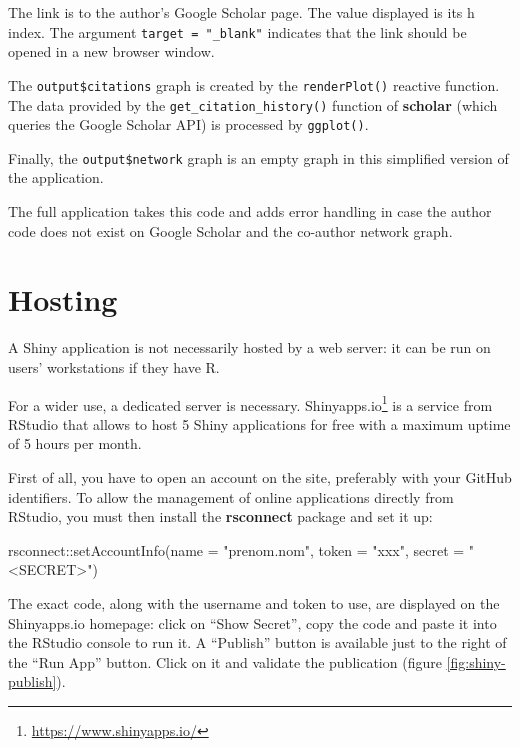 \documentclass[
  12pt,
  american,
  a4paper,
  extrafontsizes,onecolumn,openright
  ]{memoir}
\newenvironment{Shaded}{\begin{snugshade}}{\end{snugshade}}
\newcommand{\AttributeTok}[1]{\textcolor[rgb]{0.77,0.63,0.00}{#1}}
\newcommand{\FunctionTok}[1]{\textcolor[rgb]{0.00,0.00,0.00}{#1}}
\newcommand{\NormalTok}[1]{#1}
\newcommand{\SpecialCharTok}[1]{\textcolor[rgb]{0.00,0.00,0.00}{#1}}
\newcommand{\StringTok}[1]{\textcolor[rgb]{0.31,0.60,0.02}{#1}}
\begin{document}
\normalsize

The link is to the author's Google Scholar page.
The value displayed is its h index.
The argument \texttt{target\ =\ "\_blank"} indicates that the link should be opened in a new browser window.

The \texttt{output\$citations} graph is created by the \texttt{renderPlot()} reactive function.
The data provided by the \texttt{get\_citation\_history()} function of \textbf{scholar} (which queries the Google Scholar API) is processed by \texttt{ggplot()}.

Finally, the \texttt{output\$network} graph is an empty graph in this simplified version of the application.

The full application takes this code and adds error handling in case the author code does not exist on Google Scholar and the co-author network graph.

\hypertarget{sec:hebergement-shiny}{%
\section{Hosting}\label{sec:hebergement-shiny}}

A Shiny application is not necessarily hosted by a web server: it can be run on users' workstations if they have R.

For a wider use, a dedicated server is necessary.
Shinyapps.io\footnote{\url{https://www.shinyapps.io/}} is a service from RStudio that allows to host 5 Shiny applications for free with a maximum uptime of 5 hours per month.

First of all, you have to open an account on the site, preferably with your GitHub identifiers.
To allow the management of online applications directly from RStudio, you must then install the \textbf{rsconnect} package and set it up:

\scriptsize

\begin{Shaded}
\begin{Highlighting}[]
\NormalTok{rsconnect}\SpecialCharTok{::}\FunctionTok{setAccountInfo}\NormalTok{(}\AttributeTok{name =} \StringTok{"prenom.nom"}\NormalTok{, }\AttributeTok{token =} \StringTok{"xxx"}\NormalTok{,}
    \AttributeTok{secret =} \StringTok{"\textless{}SECRET\textgreater{}"}\NormalTok{)}
\end{Highlighting}
\end{Shaded}

\normalsize

The exact code, along with the username and token to use, are displayed on the Shinyapps.io homepage: click on \enquote{Show Secret}, copy the code and paste it into the RStudio console to run it.
A \enquote{Publish} button is available just to the right of the \enquote{Run App} button.
Click on it and validate the publication (figure \ref{fig:shiny-publish}).
\end{document}
